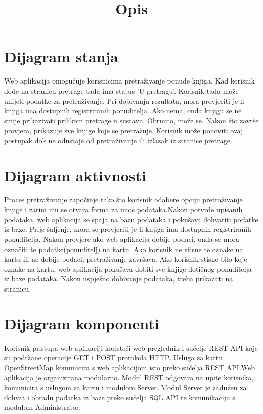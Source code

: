 \documentclass{article}
\title{Opis}
\begin{document}
	
	
	\section*{Dijagram stanja}
	Web aplikacija omogućuje korisnicima pretraživanje ponude knjiga. Kad korisnik dođe na stranicu pretrage tada ima status 'U pretragu'. Korisnik tada može unijeti podatke za pretraživanje. Pri dobivanju rezultata, mora provjeriti je li knjiga ima dostupnih registriranih ponuditelja. Ako nema, onda knjigu se ne smije prikazivati prilikom pretrage u sustavu. Obrnuto, može se. Nakon što završe provjera, prikazuje sve knjige koje se pretražuje. Korisnik može ponoviti ovaj postupak dok ne odustaje od pretraživanje ili izlazak iz stranice pretrage. 
	\section*{Dijagram aktivnosti}
	Proces pretraživanje započinje tako što korisnik odabere opciju pretraživanje knjige i zatim mu se otvara forma za unos podataka.Nakon potvrde upisanih podataka, web aplikacija se spaja na bazu podataka i pokušava dohvatiti podatke iz baze. Prije šaljenje, mora se provjeriti je li knjiga ima dostupnih registriranih ponuditelja. Nakon provjere ako web aplikacija dobije podaci, onda se mora označiti te podatke(ponuditelj) na kartu. Ako korisnik ne stisne te oznake na kartu ili ne dobije podaci, pretraživanje završava. Ako korisnik stisne bilo koje oznake na kartu, web aplikacija pokušava dobiti sve knjige dotičnog ponuditelja iz baze podataka. Nakon uspješno dobivanje podataka, treba prikazati na stranicu.
	\section*{Dijagram komponenti}
	Korisnik pristupa web aplikaciji koristeći web preglednik i sučelje REST API koje su podržane operacije GET i POST protokola HTTP. Usluga za kartu OpenStreetMap komunicira s web aplikacijom isto preko sučelja REST API.Web aplikacija je organizirana modularno. Modul REST odgovara na upite korisnika, komunicira s uslugom za kartu i modulom Server. Modul Server je zadužen za dohvat i obradu podatka iz baze preko sučelja SQL API te komunikaciju s modulom Administrator.
	
	
\end{document}
